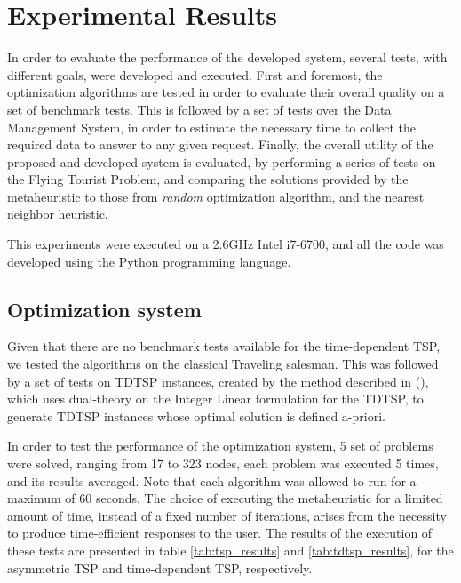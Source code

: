 \label{cap:ER}


\section{Experimental Results}
\label{sec:results}

In order to evaluate the performance of the developed system, several tests, with different goals, were developed and executed. First and foremost, the optimization algorithms are tested in order to evaluate their overall quality on a set of benchmark tests. This is followed by a set of tests over the Data Management System, in order to estimate the necessary time to collect the required data to answer to any given request. Finally, the overall utility of the proposed and developed system is evaluated, by performing a series of tests on the Flying Tourist Problem, and comparing the solutions provided by the metaheuristic to those from \textit{random} optimization algorithm, and the nearest neighbor heuristic.

This experiments were executed on a 2.6GHz Intel i7-6700, and all the code was developed using the Python programming language. 

\subsection{Optimization system}
Given that there are no benchmark tests available for the time-dependent TSP, we tested the algorithms on the classical Traveling salesman. This was followed by a set of tests on TDTSP instances, created by the method described in (\cite{TDTSP_construction}), which uses dual-theory on the Integer Linear formulation for the TDTSP, to generate TDTSP instances whose optimal solution is defined a-priori.

In order to test the performance of the optimization system, 5 set of problems were solved, ranging from 17 to 323 nodes, each problem was executed 5 times, and its results averaged. Note that each algorithm was allowed to run for a maximum of 60 seconds. The choice of executing the metaheuristic for a limited amount of time, instead of a fixed number of iterations, arises from the necessity to produce time-efficient responses to the user. The results of the execution of these tests are presented in table \ref{tab:tsp_results} and \ref{tab:tdtsp_results}, for the asymmetric TSP and time-dependent TSP, respectively.

